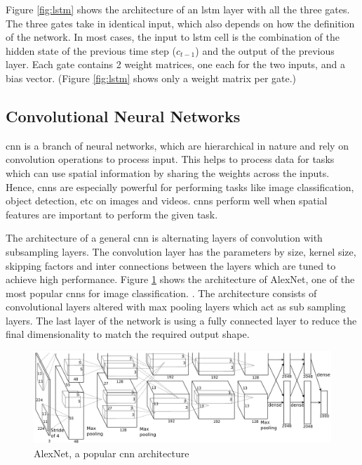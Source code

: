 Figure \ref{fig:lstm} shows the architecture of an \acrshort{lstm} layer with all the three gates. The three gates take in identical input, which also depends on how the definition of the network. In most cases, the input to \acrshort{lstm} cell is the combination of the hidden state of the previous time step ($c_{t-1}$) and the output of the previous layer. Each gate contains 2 weight matrices, one each for the two inputs, and a bias vector. (Figure \ref{fig:lstm} shows only a weight matrix per gate.) 


\subsection {Convolutional Neural Networks}
\acrfull{cnn} is a branch of neural networks, which are hierarchical in nature and rely on convolution operations to process input. This helps to process data for tasks which can use spatial information by sharing the weights across the inputs. Hence, \acrshort{cnn}s  are especially powerful for performing tasks like image classification, object detection, etc on images and videos. \acrshort{cnn}s perform well when spatial features are important to perform the given task. \cite{Krizhevsky2012ImageNetNetworks}

The architecture of a general \acrshort{cnn} is alternating layers of convolution with subsampling layers. \cite{Ciresan2011FlexibleClassification} The convolution layer has the parameters by size, kernel size, skipping factors and inter connections between the layers which are tuned to achieve high performance. Figure \ref{fig:cnn} shows the architecture of AlexNet, one of the most popular \acrshort{cnn}s for image classification. \cite{Krizhevsky2012ImageNetNetworks}. The architecture consists of convolutional layers altered with max pooling layers which act as sub sampling layers. The last layer of the network is using a fully connected layer to reduce the final dimensionality to match the required output shape.
\begin{figure}[ht]
  \begin{center}
    \includegraphics[width=\textwidth]{images/cnn.png} 
    \caption{AlexNet, a popular \acrshort{cnn} architecture  \cite{Krizhevsky2012ImageNetNetworks}}
    \label{fig:cnn}
  \end{center}
\end{figure}

